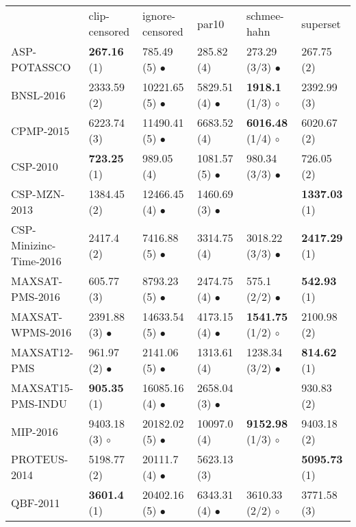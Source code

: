 \begin{tabular}{llllll}&clip-censored&ignore-censored&par10&schmee-hahn&superset\\
ASP-POTASSCO & \textbf{267.16} (1) $\phantom{\bullet}$ & 785.49 (5) $\bullet$ & 285.82 (4) $\phantom{\bullet}$ & 273.29 (3/3) $\bullet$ & 267.75 (2) $\phantom{\bullet}$\\
BNSL-2016 & 2333.59 (2) $\phantom{\bullet}$ & 10221.65 (5) $\bullet$ & 5829.51 (4) $\bullet$ & \textbf{1918.1} (1/3) $\circ$ & 2392.99 (3) $\phantom{\bullet}$\\
CPMP-2015 & 6223.74 (3) $\phantom{\bullet}$ & 11490.41 (5) $\bullet$ & 6683.52 (4) $\phantom{\bullet}$ & \textbf{6016.48} (1/4) $\circ$ & 6020.67 (2) $\phantom{\bullet}$\\
CSP-2010 & \textbf{723.25} (1) $\phantom{\bullet}$ & 989.05 (4) $\phantom{\bullet}$ & 1081.57 (5) $\bullet$ & 980.34 (3/3) $\bullet$ & 726.05 (2) $\phantom{\bullet}$\\
CSP-MZN-2013 & 1384.45 (2) $\phantom{\bullet}$ & 12466.45 (4) $\bullet$ & 1460.69 (3) $\bullet$ &  & \textbf{1337.03} (1) $\phantom{\bullet}$\\
CSP-Minizinc-Time-2016 & 2417.4 (2) $\phantom{\bullet}$ & 7416.88 (5) $\bullet$ & 3314.75 (4) $\phantom{\bullet}$ & 3018.22 (3/3) $\bullet$ & \textbf{2417.29} (1) $\phantom{\bullet}$\\
MAXSAT-PMS-2016 & 605.77 (3) $\phantom{\bullet}$ & 8793.23 (5) $\bullet$ & 2474.75 (4) $\bullet$ & 575.1 (2/2) $\bullet$ & \textbf{542.93} (1) $\phantom{\bullet}$\\
MAXSAT-WPMS-2016 & 2391.88 (3) $\bullet$ & 14633.54 (5) $\bullet$ & 4173.15 (4) $\bullet$ & \textbf{1541.75} (1/2) $\circ$ & 2100.98 (2) $\phantom{\bullet}$\\
MAXSAT12-PMS & 961.97 (2) $\bullet$ & 2141.06 (5) $\bullet$ & 1313.61 (4) $\phantom{\bullet}$ & 1238.34 (3/2) $\bullet$ & \textbf{814.62} (1) $\phantom{\bullet}$\\
MAXSAT15-PMS-INDU & \textbf{905.35} (1) $\phantom{\bullet}$ & 16085.16 (4) $\bullet$ & 2658.04 (3) $\bullet$ &  & 930.83 (2) $\phantom{\bullet}$\\
MIP-2016 & 9403.18 (3) $\circ$ & 20182.02 (5) $\bullet$ & 10097.0 (4) $\phantom{\bullet}$ & \textbf{9152.98} (1/3) $\circ$ & 9403.18 (2) $\phantom{\bullet}$\\
PROTEUS-2014 & 5198.77 (2) $\phantom{\bullet}$ & 20111.7 (4) $\bullet$ & 5623.13 (3) $\phantom{\bullet}$ &  & \textbf{5095.73} (1) $\phantom{\bullet}$\\
QBF-2011 & \textbf{3601.4} (1) $\phantom{\bullet}$ & 20402.16 (5) $\bullet$ & 6343.31 (4) $\bullet$ & 3610.33 (2/2) $\circ$ & 3771.58 (3) $\phantom{\bullet}$\\

\end{tabular}
